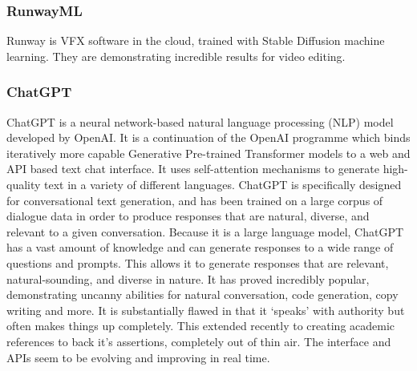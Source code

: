 \begin{comment}
-Text-to-Image
DALL-E2
Stable diffusion
Muse
Imagen
-Text-to-3D
dreamfusion
magic3d
-image-to-text
Flamingo
VisualGPT
-Text-to-video
Phenaki
Soundify
-Text-to-code
Codex
Alphacode
-Text-to-Audio
AudioLM
Whisper
Jukebox
-Text-To-Text
ChatGPT3
PEER
LaMDA
Speech From Brain
-Text-to-science
Galactica
Minerva
-Other models
Alphatensor
GATO
Human motion diffusion model
\end{comment}

\subsubsection{RunwayML}
Runway is VFX software in the cloud, trained with Stable Diffusion machine learning. They are demonstrating incredible results for video editing.
\subsubsection{ChatGPT}
ChatGPT is a neural network-based natural language processing (NLP) model developed by OpenAI. It is a continuation of the OpenAI programme which binds iteratively more capable Generative Pre-trained Transformer models to a web and API based text chat interface. It uses self-attention mechanisms to generate high-quality text in a variety of different languages. ChatGPT is specifically designed for conversational text generation, and has been trained on a large corpus of dialogue data in order to produce responses that are natural, diverse, and relevant to a given conversation. Because it is a large language model, ChatGPT has a vast amount of knowledge and can generate responses to a wide range of questions and prompts. This allows it to generate responses that are relevant, natural-sounding, and diverse in nature. It has proved incredibly popular, demonstrating uncanny abilities for natural conversation, code generation, copy writing and more. It is substantially flawed in that it `speaks' with authority but often makes things up completely. This extended recently to creating academic references to back it's assertions, completely out of thin air. The interface and APIs seem to be evolving and improving in real time.\par
